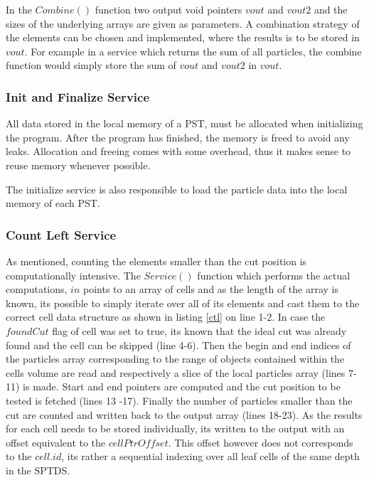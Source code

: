 \documentclass[]{article}
\begin{document}
In the $Combine()$ function two output void pointers $vout$ and $vout2$ and the sizes of the underlying arrays are given as parameters. A combination strategy of the elements can be chosen and implemented, where the results is to be stored in $vout$. For example in a service which returns the sum of all particles, the combine function would simply store the sum of $vout$ and $vout2$ in $vout$.

\subsubsection{Init and Finalize Service}

All data stored in the local memory of a PST, must be allocated when initializing the program. After the program has finished, the memory is freed to avoid any leaks. Allocation and freeing comes with some overhead, thus it makes sense to reuse memory whenever possible. 

The initialize service is also responsible to load the particle data into the local memory of each PST. 

\subsubsection{Count Left Service}

As mentioned, counting the elements smaller than the cut position is computationally intensive. 
The $Service()$ function which performs the actual computations, $in$ points to an array of cells and as the length of the array is known, its possible to simply iterate over all of its elements and cast them to the correct cell data structure as shown in listing \ref{ctl} on line 1-2. In case the $foundCut$ flag of cell was set to true, its known that the ideal cut was already found and the cell can be skipped (line 4-6).
Then the begin and end indices of the particles array corresponding to the range of objects contained within the cells volume are read and respectively a slice of the local particles array (lines 7-11) is made. Start and end pointers are computed and the cut position to be tested is fetched (lines 13 -17). Finally the number of particles smaller than the cut are counted and written back to the output array (lines 18-23). As the results for each cell needs to be stored individually, its written to the output with an offset equivalent to the $cellPtrOffset$. This offset however does not corresponds to the $cell.id$, its rather a sequential indexing over all leaf cells of the same depth in the SPTDS. 
\end{document}
